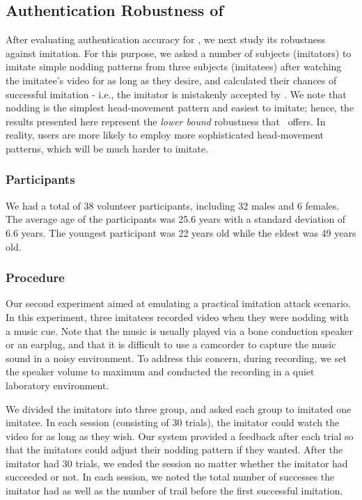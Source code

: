 
\subsection{Authentication Robustness of \systemname} After evaluating authentication accuracy for \systemname, we next study its robustness against imitation. For this purpose, we asked a number of subjects (imitators) to imitate simple nodding patterns from three subjects (imitatees) after watching the imitatee's video for as long as they desire, and calculated their chances of successful imitation - i.e., the imitator is mistakenly accepted by \systemname. We note that nodding is the simplest head-movement pattern and easiest to imitate; hence, the results presented here represent the \emph{lower bound} robustness that \systemname~offers. In reality, users are more likely to employ more sophisticated head-movement patterns, which will be much harder to imitate.

\subsubsection{Participants}
We had a total of 38 volunteer participants, including 32 males and 6 females. The average age of the participants was 25.6 years with a standard deviation
of 6.6 years. The youngest participant was 22 years old while the eldest was 49 years old.

\subsubsection{Procedure}
Our second experiment aimed at emulating a practical imitation attack scenario. In this experiment, three imitatees recorded video when they were nodding with a music cue. Note that the music is usually played via a bone conduction speaker or an earplug, and that it is difficult to use a camcorder to capture the music sound in a noisy environment. To address this concern, during recording, we set the speaker volume to maximum and conducted the recording in a quiet laboratory environment.

We divided the imitators into three group, and asked each group to imitated one imitatee. In each session (consisting of 30 trials), the imitator could watch the video for as long as they wish. Our system provided a feedback after each trial so that the imitators could adjust their nodding pattern if they wanted. After the imitator had 30 trials, 
we ended the session no matter whether the imitator had succeeded or not. In each session, we noted the total number of successes the imitator had as well as the number of trail before the first successful imitation. %

